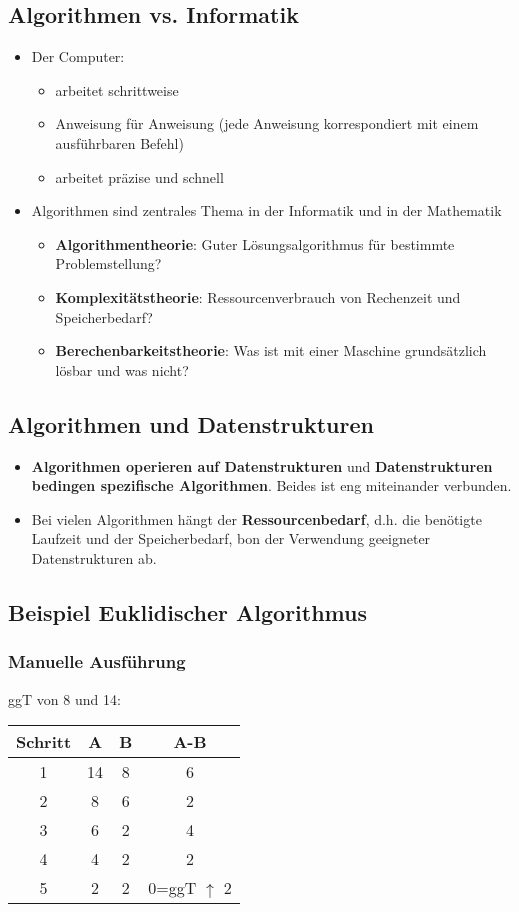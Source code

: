 \subsection{Algorithmen vs. Informatik}
\begin{itemize}
    \item Der Computer:
    \begin{itemize}
        \item arbeitet schrittweise
        \item Anweisung für Anweisung (jede Anweisung korrespondiert mit einem ausführbaren Befehl)
        \item arbeitet präzise und schnell
    \end{itemize}
    \item Algorithmen sind zentrales Thema in der Informatik und in der Mathematik
    \begin{itemize}
        \item \textbf{Algorithmentheorie}: Guter Lösungsalgorithmus für bestimmte Problemstellung?
        \item \textbf{Komplexitätstheorie}: Ressourcenverbrauch von Rechenzeit und Speicherbedarf?
        \item \textbf{Berechenbarkeitstheorie}: Was ist mit einer Maschine grundsätzlich lösbar und was nicht?
    \end{itemize}
\end{itemize}

\subsection{Algorithmen und Datenstrukturen}
\begin{itemize}
    \item \textbf{Algorithmen operieren auf Datenstrukturen} und \textbf{Datenstrukturen bedingen spezifische Algorithmen}. Beides ist eng miteinander verbunden.
    \item Bei vielen Algorithmen hängt der \textbf{Ressourcenbedarf}, d.h. die benötigte Laufzeit und der Speicherbedarf, bon der Verwendung geeigneter Datenstrukturen ab.
\end{itemize}

\subsection{Beispiel Euklidischer Algorithmus}
\subsubsection{Manuelle Ausführung}
ggT von 8 und 14:\\
\begin{tabular}{|c|c|c|c|}
    \hline
        Schritt&A&B&A-B\\
        \hline
        1&14&8&6\\
        2&8&6&2\\
        3&6&2&4\\
        4&4&2&\cellcolor{background}2\\
        5&2&2&0=ggT $\uparrow$ 2\\
    \hline
\end{tabular}

